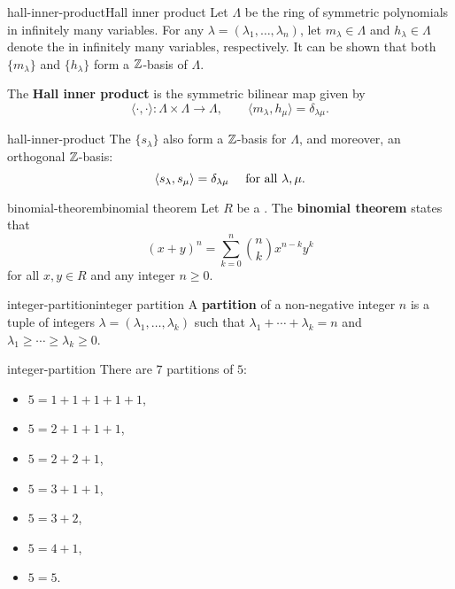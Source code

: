 \begin{topic}{hall-inner-product}{Hall inner product}
    Let $\Lambda$ be the ring of symmetric polynomials in infinitely many variables. For any  $\lambda = (\lambda_1, \ldots, \lambda_n)$, let $m_\lambda \in \Lambda$ and $h_\lambda \in \Lambda$ denote the  in infinitely many variables, respectively. It can be shown that both $\{ m_\lambda \}$ and $\{ h_\lambda \}$ form a $\mathbb{Z}$-basis of $\Lambda$.
    
    The \textbf{Hall inner product} is the symmetric bilinear map given by
    \[ \langle \cdot, \cdot \rangle : \Lambda \times \Lambda \to \Lambda, \qquad \langle m_\lambda, h_\mu \rangle = \delta_{\lambda \mu} . \]
\end{topic}

\begin{example}{hall-inner-product}
    The  $\{ s_\lambda \}$ also form a $\mathbb{Z}$-basis for $\Lambda$, and moreover, an orthogonal $\mathbb{Z}$-basis:
    \[ \langle s_\lambda, s_\mu \rangle = \delta_{\lambda \mu} \quad \textup{ for all } \lambda, \mu . \]
\end{example}

\begin{topic}{binomial-theorem}{binomial theorem}
    Let $R$ be a . The \textbf{binomial theorem} states that
    \[ (x + y)^n = \sum_{k = 0}^{n} \binom{n}{k} x^{n - k} y^k \]
    for all $x, y \in R$ and any integer $n \ge 0$.
\end{topic}

\begin{topic}{integer-partition}{integer partition}
    A \textbf{partition} of a non-negative integer $n$ is a tuple of integers $\lambda = (\lambda_1, \ldots, \lambda_k)$ such that $\lambda_1 + \cdots + \lambda_k = n$ and $\lambda_1 \ge \cdots \ge \lambda_k \ge 0$.
\end{topic}

\begin{example}{integer-partition}
    There are $7$ partitions of $5$:
    \begin{itemize}
        \item $5 = 1 + 1 + 1 + 1 + 1$,
        \item $5 = 2 + 1 + 1 + 1$,
        \item $5 = 2 + 2 + 1$,
        \item $5 = 3 + 1 + 1$,
        \item $5 = 3 + 2$,
        \item $5 = 4 + 1$,
        \item $5 = 5$.
    \end{itemize}
\end{example}

